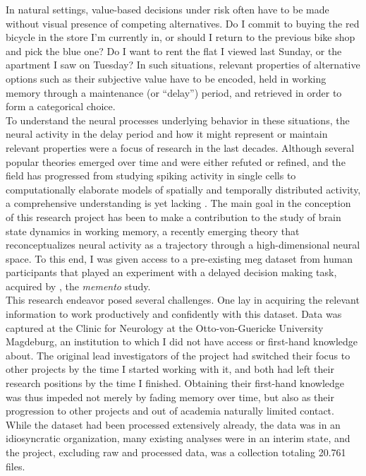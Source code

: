In natural settings, value-based decisions under risk often have to be made without visual presence of competing alternatives.
Do I commit to buying the red bicycle in the store I'm currently in, or should I return to the previous bike shop and pick the blue one?
Do I want to rent the flat I viewed last Sunday, or the apartment I saw on Tuesday?
In such situations, relevant properties of alternative options such as their subjective value have to be encoded, held in working memory through a maintenance (or ``delay'') period, and retrieved in order to form a categorical choice.\\
To understand the neural processes underlying behavior in these situations, the neural activity in the delay period and how it might represent or maintain relevant properties were a focus of research in the last decades.
Although several popular theories emerged over time and were either refuted or refined, and the field has progressed from studying spiking activity in single cells to computationally elaborate models of spatially and temporally distributed activity, a comprehensive understanding is yet lacking \citep{sreenivasan2019and}.
The main goal in the conception of this research project has been to make a contribution to the study of brain state dynamics in working memory, a recently emerging theory that reconceptualizes neural activity as a trajectory through a high-dimensional neural space.
To this end, I was given access to a pre-existing \gls{meg} dataset from human participants that played an experiment with a delayed decision making task, acquired by \citet{kaiser}, the \textit{memento} study.\\
This research endeavor posed several challenges.
One lay in acquiring the relevant information to work productively and confidently with this dataset.
Data was captured at the Clinic for Neurology at the Otto-von-Guericke University Magdeburg, an institution to which I did not have access or first-hand knowledge about.
The original lead investigators of the project had switched their focus to other projects by the time I started working with it, and both had left their research positions by the time I finished.
Obtaining their first-hand knowledge was thus impeded not merely by fading memory over time, but also as their progression to other projects and out of academia naturally limited contact.
While the dataset had been processed extensively already, the data was in an idiosyncratic organization, many existing analyses were in an interim state, and the project, excluding raw and processed data, was a collection totaling 20.761 files.
